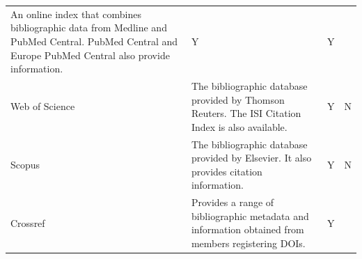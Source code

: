 \documentclass[]{krantz}
\begin{document}
\begin{longtable}[]{@{}llcc@{}}
\begin{minipage}[t]{0.74\columnwidth}
An online index that combines bibliographic data from Medline and PubMed
Central. PubMed Central and Europe PubMed Central also provide
information.\strut
\end{minipage} & \begin{minipage}[t]{0.02\columnwidth}\centering\strut
Y\strut
\end{minipage} & \begin{minipage}[t]{0.02\columnwidth}\centering\strut
Y\strut
\end{minipage}\tabularnewline
\begin{minipage}[t]{0.10\columnwidth}\raggedright\strut
Web of Science\strut
\end{minipage} & \begin{minipage}[t]{0.74\columnwidth}\raggedright\strut
The bibliographic database provided by Thomson Reuters. The ISI Citation
Index is also available.\strut
\end{minipage} & \begin{minipage}[t]{0.02\columnwidth}\centering\strut
Y\strut
\end{minipage} & \begin{minipage}[t]{0.02\columnwidth}\centering\strut
N\strut
\end{minipage}\tabularnewline
\begin{minipage}[t]{0.10\columnwidth}\raggedright\strut
Scopus\strut
\end{minipage} & \begin{minipage}[t]{0.74\columnwidth}\raggedright\strut
The bibliographic database provided by Elsevier. It also provides
citation information.\strut
\end{minipage} & \begin{minipage}[t]{0.02\columnwidth}\centering\strut
Y\strut
\end{minipage} & \begin{minipage}[t]{0.02\columnwidth}\centering\strut
N\strut
\end{minipage}\tabularnewline
\begin{minipage}[t]{0.10\columnwidth}\raggedright\strut
Crossref\strut
\end{minipage} & \begin{minipage}[t]{0.74\columnwidth}\raggedright\strut
Provides a range of bibliographic metadata and information obtained from
members registering DOIs.\strut
\end{minipage} & \begin{minipage}[t]{0.02\columnwidth}\centering\strut
Y\strut
\end{minipage} & \begin{minipage}[t]{0.02\columnwidth}\centering\strut

\end{minipage}
\end{longtable}
\end{document}
